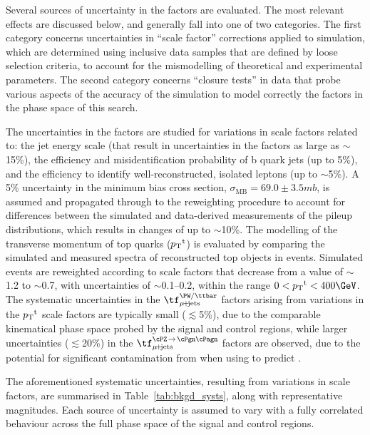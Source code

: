 Several sources of uncertainty in the \tf factors are evaluated.
The most relevant effects are discussed below, and generally fall into
one of two categories. The first category concerns uncertainties in
``scale factor'' corrections applied to simulation, which are
determined using inclusive data samples that are defined by loose
selection criteria, to account for the mismodelling of theoretical and
experimental parameters. The second category concerns ``closure
tests'' in data that probe various aspects of the accuracy of the
simulation to model correctly the \tf factors in the phase space
of this search.

The uncertainties in the \tf factors are studied for variations
in scale factors related to: the jet energy scale (that result in
uncertainties in the \tf factors as large as $\sim$15\%), the
efficiency and misidentification probability of b quark jets (up to
5\%), and the efficiency to identify well-reconstructed, isolated
leptons (up to $\sim$5\%). A 5\% uncertainty in the minimum bias cross
section, $\sigma_\text{MB} = 69.0 \pm 3.5\unit{mb}$, is assumed and
propagated through to the reweighting procedure to account for
differences between the simulated and data-derived measurements of the
pileup distributions, which results in changes of up to
$\sim$10\%. The modelling of the transverse momentum of top quarks
($\Pt^\text{t}$) is evaluated by comparing the simulated and measured
\Pt spectra of reconstructed top objects in \ttbar events. 
Simulated events are reweighted according to scale factors that
decrease from a value of $\sim$1.2 to $\sim$0.7, with uncertainties of
$\sim$0.1--0.2, within the range $0 < \Pt^\text{t} < 400\GeV$. 
The systematic uncertainties in the $\tf^\text{\PW/\ttbar}_{\mj}$
factors arising from variations in the $\Pt^\text{t}$ scale factors
are typically small ($\lesssim$5\%), due to the comparable kinematical
phase space probed by the signal and control regions, while larger
uncertainties ($\lesssim$20\%) in the $\tf^{\text{\znunu}}_{\mj}$
factors are observed, due to the potential for significant
contamination from \ttbar when using \wlj to predict \znunuj. 

The aforementioned systematic uncertainties, resulting from variations
in scale factors, are summarised in Table~\ref{tab:bkgd_systs}, along
with representative magnitudes.  Each source of uncertainty is assumed
to vary with a fully correlated behaviour across the full phase space
of the signal and control regions.

